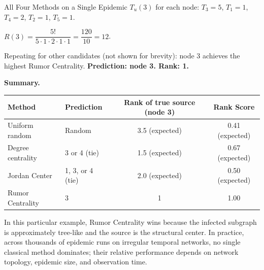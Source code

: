 \begin{examplebox}{All Four Methods on a Single Epidemic}
$T_u(3)$ for each node: $T_3 = 5$, $T_1 = 1$, $T_4 = 2$, $T_2 = 1$, $T_5 = 1$.

$R(3) = \dfrac{5!}{5 \cdot 1 \cdot 2 \cdot 1 \cdot 1} = \dfrac{120}{10} = 12$.

Repeating for other candidates (not shown for brevity): node 3 achieves the highest
Rumor Centrality. \textbf{Prediction: node 3. Rank: 1.}

\medskip
\textbf{Summary.}
\begin{center}
\small
\begin{tabular}{llcc}
\toprule
Method & Prediction & Rank of true source (node 3) & Rank Score \\
\midrule
Uniform random & Random & 3.5 (expected) & 0.41 (expected) \\
Degree centrality & 3 or 4 (tie) & 1.5 (expected) & 0.67 (expected) \\
Jordan Center & 1, 3, or 4 (tie) & 2.0 (expected) & 0.50 (expected) \\
Rumor Centrality & 3 & 1 & 1.00 \\
\bottomrule
\end{tabular}
\end{center}

In this particular example, Rumor Centrality wins because the infected subgraph is
approximately tree-like and the source is the structural center. In practice, across
thousands of epidemic runs on irregular temporal networks, no single classical method
dominates; their relative performance depends on network topology, epidemic size, and
observation time.
\end{examplebox}

